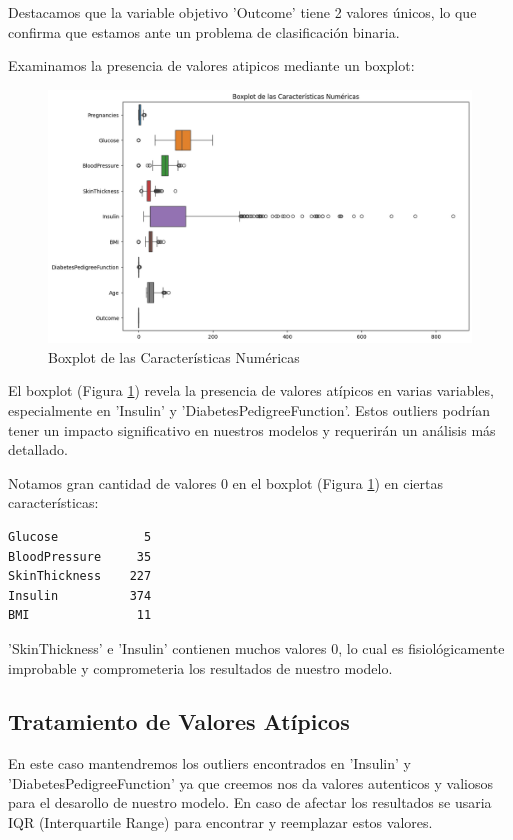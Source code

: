 \documentclass[conference]{IEEEtran}
\begin{document}
Destacamos que la variable objetivo 'Outcome' tiene 2 valores únicos, lo que confirma que estamos ante un problema de clasificación binaria.

Examinamos la presencia de valores atipicos mediante un boxplot:

\begin{figure}[h]
\centering
\includegraphics[width=\linewidth]{boxplot_caracteristicas.png}
\caption{Boxplot de las Características Numéricas}
\label{fig:boxplot}
\end{figure}

El boxplot (Figura \ref{fig:boxplot}) revela la presencia de valores atípicos en varias variables, especialmente en 'Insulin' y 'DiabetesPedigreeFunction'. Estos outliers podrían tener un impacto significativo en nuestros modelos y requerirán un análisis más detallado. 

Notamos gran cantidad de valores 0 en el boxplot (Figura \ref{fig:boxplot}) en ciertas características: 

\begin{lstlisting}
Glucose            5
BloodPressure     35
SkinThickness    227
Insulin          374
BMI               11
\end{lstlisting}

'SkinThickness' e 'Insulin' contienen muchos valores 0, lo cual es fisiológicamente improbable y comprometeria los resultados de nuestro modelo.

\subsection{Tratamiento de Valores Atípicos}

En este caso mantendremos los outliers encontrados en 'Insulin' y 'DiabetesPedigreeFunction' ya que creemos nos da valores autenticos y valiosos para el desarollo de nuestro modelo. En caso de afectar los resultados se usaria  IQR (Interquartile Range) para encontrar y reemplazar estos valores.
\end{document}
